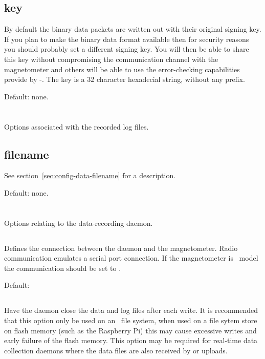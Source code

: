 \subsection{key}
By default the binary data packets are written out with their original
signing key. If you plan to make the binary data format available then
for security reasons you should probably set a different signing
key. You will then be able to share this key without compromising the
communication channel with the magnetometer and others will be able to
use the error-checking capabilities provide by \hmac-\mdfive. The key
is a 32 character hexadecial string, without any  prefix.

Default: none.


\section{\code{[logfile]}}
Options associated with the recorded log files. 

\subsection{filename}

See section~\ref{sec:config-data-filename} for a description.

Default: none.



\section{\code[daemon]}
Options relating to the data-recording daemon.

\subsection{}
Defines the connection between the daemon and the magnetometer. Radio
communication emulates a serial port connection. If the magnetometer
is \PoE\ model the communication should be set to .

Default: 

\subsection{}
Have the daemon close the data and log files after each write. It is
recommended that this option only be used on an \nfs\ file system,
when used on a file sytem store on flash memory (such as the Raspberry
Pi) this may cause excessive writes and early failure of the flash
memory. This option may be required for real-time data collection
daemons where the data files are also received by  or
 uploads.

